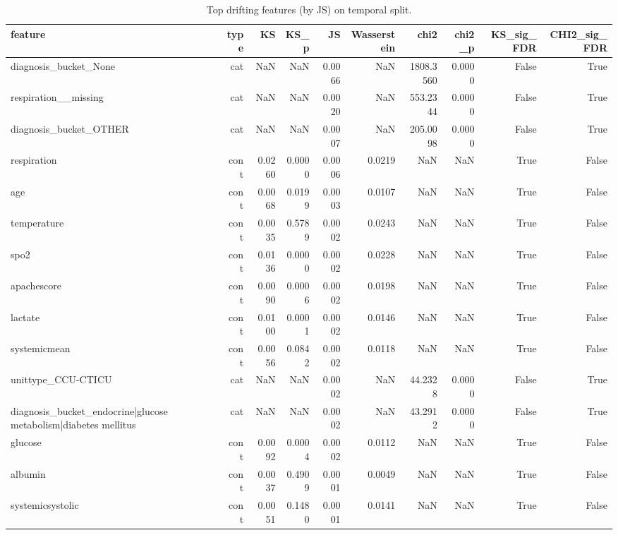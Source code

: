 \begin{table}
\caption{Top drifting features (by JS) on temporal split.}
\label{tab:topdrifting-temporal}
\begin{tabular}{lrrrrrrrrr}
\toprule
feature & type & KS & KS\_p & JS & Wasserstein & chi2 & chi2\_p & KS\_sig\_FDR & CHI2\_sig\_FDR \\
\midrule
diagnosis\_bucket\_None & cat & NaN & NaN & 0.0066 & NaN & 1808.3560 & 0.0000 & False & True \\
respiration\_\_missing & cat & NaN & NaN & 0.0020 & NaN & 553.2344 & 0.0000 & False & True \\
diagnosis\_bucket\_OTHER & cat & NaN & NaN & 0.0007 & NaN & 205.0098 & 0.0000 & False & True \\
respiration & cont & 0.0260 & 0.0000 & 0.0006 & 0.0219 & NaN & NaN & True & False \\
age & cont & 0.0068 & 0.0199 & 0.0003 & 0.0107 & NaN & NaN & True & False \\
temperature & cont & 0.0035 & 0.5789 & 0.0002 & 0.0243 & NaN & NaN & True & False \\
spo2 & cont & 0.0136 & 0.0000 & 0.0002 & 0.0228 & NaN & NaN & True & False \\
apachescore & cont & 0.0090 & 0.0006 & 0.0002 & 0.0198 & NaN & NaN & True & False \\
lactate & cont & 0.0100 & 0.0001 & 0.0002 & 0.0146 & NaN & NaN & True & False \\
systemicmean & cont & 0.0056 & 0.0842 & 0.0002 & 0.0118 & NaN & NaN & True & False \\
unittype\_CCU-CTICU & cat & NaN & NaN & 0.0002 & NaN & 44.2328 & 0.0000 & False & True \\
diagnosis\_bucket\_endocrine|glucose metabolism|diabetes mellitus & cat & NaN & NaN & 0.0002 & NaN & 43.2912 & 0.0000 & False & True \\
glucose & cont & 0.0092 & 0.0004 & 0.0002 & 0.0112 & NaN & NaN & True & False \\
albumin & cont & 0.0037 & 0.4909 & 0.0001 & 0.0049 & NaN & NaN & True & False \\
systemicsystolic & cont & 0.0051 & 0.1480 & 0.0001 & 0.0141 & NaN & NaN & True & False \\
\bottomrule
\end{tabular}
\end{table}
